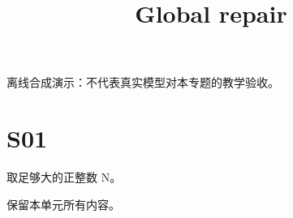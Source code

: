 \documentclass[UTF8,fontset=fandol,11pt]{ctexart}
\title{Global repair}
\date{}
\begin{document}
\maketitle
\par\noindent 离线合成演示：不代表真实模型对本专题的教学验收。\par
\section{S01}\label{sec:S01}
取足够大的正整数 N。\par
保留本单元所有内容。\par
\end{document}
